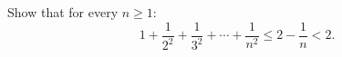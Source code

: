 Show that for every $n \geq 1$:
\[
1 + \frac{1}{2^2} + \frac{1}{3^2} + \cdots + \frac{1}{n^2} \leq 2 - \frac{1}{n} < 2.
\]
